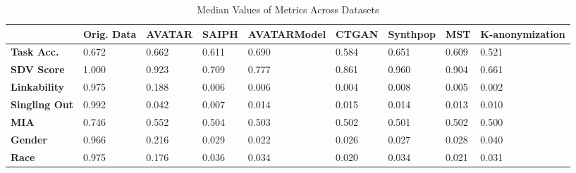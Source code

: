\begin{table}
\caption{Median Values of Metrics Across Datasets}
\label{tab:median_metrics}
\begin{tabular}{lllllllll}
\toprule
 & Orig. Data & AVATAR & SAIPH & AVATARModel & CTGAN & Synthpop & MST & K-anonymization \\
\midrule
\textbf{Task Acc.} & 0.672 & 0.662 & 0.611 & 0.690 & 0.584 & 0.651 & 0.609 & 0.521 \\
\textbf{SDV Score} & 1.000 & 0.923 & 0.709 & 0.777 & 0.861 & 0.960 & 0.904 & 0.661 \\
\textbf{Linkability} & 0.975 & 0.188 & 0.006 & 0.006 & 0.004 & 0.008 & 0.005 & 0.002 \\
\textbf{Singling Out} & 0.992 & 0.042 & 0.007 & 0.014 & 0.015 & 0.014 & 0.013 & 0.010 \\
\textbf{MIA} & 0.746 & 0.552 & 0.504 & 0.503 & 0.502 & 0.501 & 0.502 & 0.500 \\
\textbf{Gender} & 0.966 & 0.216 & 0.029 & 0.022 & 0.026 & 0.027 & 0.028 & 0.040 \\
\textbf{Race} & 0.975 & 0.176 & 0.036 & 0.034 & 0.020 & 0.034 & 0.021 & 0.031 \\
\bottomrule
\end{tabular}
\end{table}
